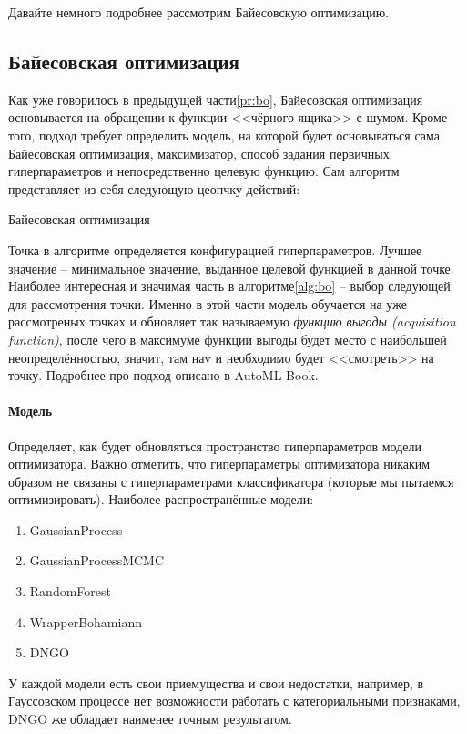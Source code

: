 \documentclass[times,specification,annotation]{itmo-student-thesis}
\begin{document}
	Давайте немного подробнее рассмотрим Байесовскую оптимизацию.
	
	\subsection{Байесовская оптимизация} \label{ss:bo}
	Как уже говорилось в предыдущей части\ref{pr:bo}, Байесовская оптимизация основывается на обращении к функции <<чёрного ящика>> с шумом. Кроме того, подход требует определить модель, на которой будет основываться сама Байесовская оптимизация, максимизатор, способ задания первичных гиперпараметров и непосредственно целевую функцию. Сам алгоритм представляет из себя следующую цеопчку действий:
	
	\begin{algorithm}[!ht]
		\caption{Байесовская оптимизация}\label{alg:bo}
		\begin{algorithmic}
			\EndFor
		\end{algorithmic}
	\end{algorithm}

	Точка в алгоритме определяется конфигурацией гиперпараметров. Лучшее значение -- минимальное значение, выданное целевой функцией в данной точке. Наиболее интересная и значимая часть в алгоритме\ref{alg:bo} -- выбор следующей для рассмотрения точки. Именно в этой части модель обучается на уже рассмотреных точках и обновляет так называемую \textit{функцию выгоды (acquisition function)}, после чего в максимуме функции выгоды будет место с наибольшей неопределённостью, значит, там наv и необходимо будет <<смотреть>> на точку. Подробнее про подход описано в AutoML Book\cite{automlbook19a}.

	\paragraph{Модель} Определяет, как будет обновляться пространство гиперпараметров модели оптимизатора. Важно отметить, что гиперпараметры оптимизатора никаким образом не связаны с гиперпараметрами классификатора (которые мы пытаемся оптимизировать). Наиболее распространённые модели:
	\begin{enumerate}
		\item GaussianProcess \label{nm:gp}
		\item GaussianProcessMCMC
		\item RandomForest \label{nm:rf}
		\item WrapperBohamiann
		\item DNGO
	\end{enumerate}
	У каждой модели есть свои приемущества и свои недостатки, например, в Гауссовском процессе нет возможности работать с категориальными признаками, DNGO же обладает наименее точным результатом.
\end{document}
